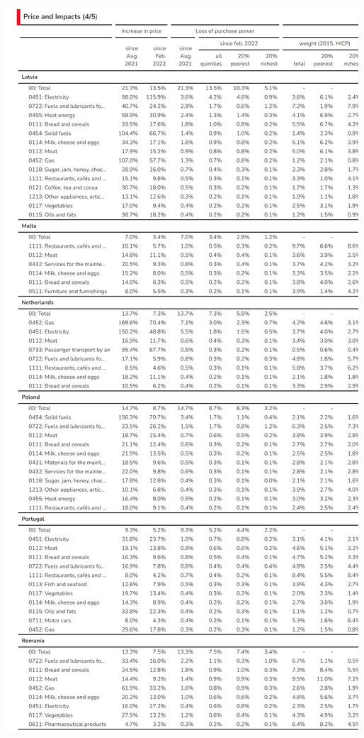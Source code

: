 \documentclass[
  9pt,
  a4paper,
  numbers=noendperiod,
  DIV=12]{scrartcl}
\begin{document}
\includegraphics{../svg/annex_4.png}
\end{document}
